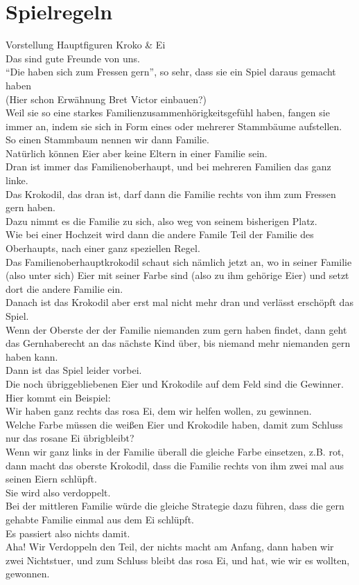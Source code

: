 \documentclass{scrartcl}
\begin{document}
	\section{Spielregeln} 
	Vorstellung Hauptfiguren Kroko \& Ei\\
	Das sind gute Freunde von uns.\\
	"`Die haben sich zum Fressen gern"', so sehr, dass sie ein Spiel daraus gemacht haben\\
	(Hier schon Erwähnung Bret Victor einbauen?)\\
	Weil sie so eine starkes Familienzusammenhörigkeitsgefühl haben, fangen sie immer an, indem sie sich in Form eines oder mehrerer Stammbäume aufstellen.\\
	So einen Stammbaum nennen wir dann Familie.\\
	Natürlich können Eier aber keine Eltern in einer Familie sein.\\
	Dran ist immer das Familienoberhaupt, und bei mehreren Familien das ganz linke.\\
	Das Krokodil, das dran ist, darf dann die Familie rechts von ihm zum Fressen gern haben.\\
	Dazu nimmt es die Familie zu sich, also weg von seinem bisherigen Platz.\\
	Wie bei einer Hochzeit wird dann die andere Famile Teil der Familie des Oberhaupts, nach einer ganz speziellen Regel.\\
	Das Familienoberhauptkrokodil schaut sich nämlich jetzt an, wo in seiner Familie (also unter sich) Eier mit seiner Farbe sind (also zu ihm gehörige Eier) und setzt dort die andere Familie ein. \\
	Danach ist das Krokodil aber erst mal nicht mehr dran und verlässt erschöpft das Spiel.\\
	Wenn der Oberste der der Familie niemanden zum gern haben findet, dann geht das Gernhaberecht an das nächste Kind über, bis niemand mehr niemanden gern haben kann.\\
	Dann ist das Spiel leider vorbei.\\
	Die noch übriggebliebenen Eier und Krokodile auf dem Feld sind die Gewinner.\\
	
	Hier kommt ein Beispiel:\\
	Wir haben ganz rechts das rosa Ei, dem wir helfen wollen, zu gewinnen.\\
	Welche Farbe müssen die weißen Eier und Krokodile haben, damit zum Schluss nur das rosane Ei übrigbleibt?\\
	Wenn wir ganz links in der Familie überall die gleiche Farbe einsetzen, z.B. rot, dann macht das oberste Krokodil, dass die Familie rechts von ihm zwei mal aus seinen Eiern schlüpft.\\
	Sie wird also verdoppelt.\\
	Bei der mittleren Familie würde die gleiche Strategie dazu führen, dass die gern gehabte Familie einmal aus dem Ei schlüpft.\\
	Es passiert also nichts damit.\\
	Aha! Wir Verdoppeln den Teil, der nichts macht am Anfang, dann haben wir zwei Nichtstuer, und zum Schluss bleibt das rosa Ei, und hat, wie wir es wollten, gewonnen.
	
\end{document}
